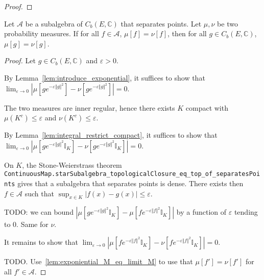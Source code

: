 \begin{proof}\leanok
\end{proof}

\begin{lemma}\label{lem:Cb_eq_of_separating}
Let $\mathcal A$ be a subalgebra of $C_b(E, \mathbb{C})$ that separates points. Let $\mu, \nu$ be two probability measures. If for all $f \in \mathcal A$, $\mu[f] = \nu[f]$, then for all $g \in C_b(E, \mathbb{C})$, $\mu[g] = \nu[g]$.
\end{lemma}

\begin{proof}
Let $g \in C_b(E, \mathbb{C})$ and $\varepsilon > 0$.

By Lemma~\ref{lem:introduce_exponential}, it suffices to show that $\lim_{\varepsilon \to 0} \left\vert \mu\left[g e^{-\varepsilon \Vert g \Vert^2} \right] - \nu\left[g e^{-\varepsilon \Vert g \Vert^2} \right] \right\vert = 0$.

The two measures are inner regular, hence there exists $K$ compact with $\mu(K^c) \le \varepsilon$ and $\nu(K^c) \le \varepsilon$.

By Lemma~\ref{lem:integral_restrict_compact}, it suffices to show that $\lim_{\varepsilon \to 0} \left\vert \mu\left[g e^{-\varepsilon \Vert g \Vert^2} \mathbb{I}_K \right] - \nu\left[g e^{-\varepsilon \Vert g \Vert^2} \mathbb{I}_K \right] \right\vert = 0$.

On $K$, the Stone-Weierstrass theorem \texttt{ContinuousMap.starSubalgebra\_topologicalClosure\_eq\_top\_of\_separatesPoints} gives that a subalgebra that separates points is dense. There exists then $f \in \mathcal A$ such that $\sup_{x \in K} \left\vert f(x) - g(x) \right\vert \le \varepsilon$.

TODO: we can bound $\left\vert \mu\left[g e^{-\varepsilon \Vert g \Vert^2} \mathbb{I}_K \right] - \mu\left[f e^{-\varepsilon \Vert f \Vert^2} \mathbb{I}_K \right] \right\vert$ by a function of $\varepsilon$ tending to 0. Same for $\nu$.

It remains to show that $\lim_{\varepsilon \to 0} \left\vert \mu\left[f e^{-\varepsilon \Vert f \Vert^2} \mathbb{I}_K \right] - \nu\left[f e^{-\varepsilon \Vert f \Vert^2} \mathbb{I}_K \right] \right\vert = 0$.

TODO. Use~\ref{lem:exponiential_M_eq_limit_M} to use that $\mu[f'] = \nu[f']$ for all $f' \in \mathcal A$.
\end{proof}


